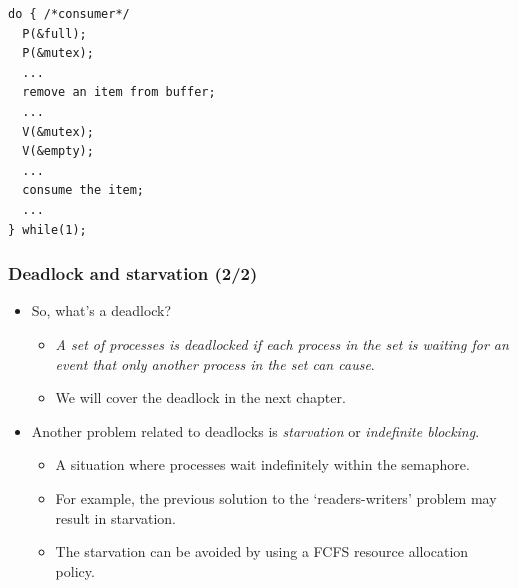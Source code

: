 \documentclass[CJKutf8,xcolor=pdftex,dvipsnames,table]{beamer}
\begin{document}
\begin{CJK*}{UTF8}{song}
\begin{frame}[fragile]
\begin{minipage}[c]{0.5\textwidth}
  \pause

  \end{minipage}%
  \begin{minipage}[c]{0.5\textwidth}

\begin{lstlisting}
do { /*consumer*/
  P(&full);
  P(&mutex);
  ...
  remove an item from buffer;
  ...
  V(&mutex);
  V(&empty);
  ...
  consume the item;
  ...
} while(1);
\end{lstlisting}

  \end{minipage}
\end{frame}

  \begin{frame}
  \frametitle{Deadlock and starvation (2/2)} \pause
  \begin{itemize}
  \item{So, what's a deadlock?} \pause
    \begin{itemize}
    \item{\emph{A set of processes is deadlocked if each process in the set is waiting for an event that only another process in the set can cause}.} \pause
    \item{We will cover the deadlock in the next chapter.} \pause
    \end{itemize}
  \item{Another problem related to deadlocks is \emph{starvation} or \emph{indefinite blocking}.} \pause
    \begin{itemize}
    \item{A situation where processes wait indefinitely within the semaphore.} \pause
    \item{For example, the previous solution to the `readers-writers' problem may result in starvation.} \pause
    \item{The starvation can be avoided by using a FCFS resource allocation policy.}
    \end{itemize}
  \end{itemize}
  \end{frame}


\end{CJK*}
\end{document}
